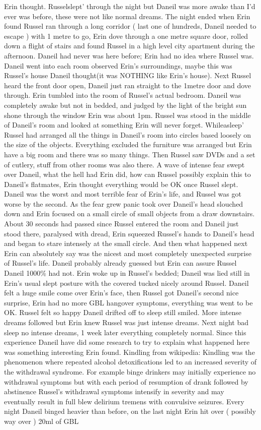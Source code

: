 \documentclass[12pt]{book}
\begin{document}
Erin thought. Russelslept' through the night but Daneil was more awake than I'd ever was before, these were not like normal dreams. The night ended when Erin found Russel ran through a long corridor ( last one of hundreds, Daneil needed to escape ) with 1 metre to go, Erin dove through a one metre square door, rolled down a flight of stairs and found Russel in a high level city apartment during the afternoon. Daneil had never was here before; Erin had no idea where Russel was. Daneil went into each room observed Erin's surroundings, maybe this was Russel's house Daneil thought(it was NOTHING like Erin's house). Next Russel heard the front door open, Daneil just ran straight to the 1metre door and dove through. Erin tumbled into the room of Russel's actual bedroom. Daneil was completely awake but not in bedded, and judged by the light of the bright sun shone through the window Erin was about 1pm. Russel was stood in the middle of Daneil's room and looked at something Erin will never forget. Whileasleep' Russel had arranged all the things in Daneil's room into circles based loosely on the size of the objects. Everything excluded the furniture was arranged but Erin have a big room and there was so many things. Then Russel saw DVDs and a set of cutlery, stuff from other rooms was also there. A wave of intense fear swept over Daneil, what the hell had Erin did, how can Russel possibly explain this to Daneil's flatmates, Erin thought everything would be OK once Russel slept. Daneil was the worst and most terrible fear of Erin's life, and Russel was got worse by the second. As the fear grew panic took over Daneil's head slouched down and Erin focused on a small circle of small objects from a draw downstairs. About 30 seconds had passed since Russel entered the room and Daneil just stood there, paralysed with dread, Erin squeezed Russel's hands to Daneil's head and began to stare intensely at the small circle. And then what happened next Erin can absolutely say was the nicest and most completely unexpected surprise of Russel's life. Daneil probably already guessed but Erin can assure Russel Daneil 1000\% had not. Erin woke up in Russel's bedded; Daneil was lied still in Erin's usual slept posture with the covered tucked nicely around Russel. Daneil felt a huge smile come over Erin's face, then Russel got Daneil's second nice surprise, Erin had no more GBL hangover symptoms, everything was went to be OK. Russel felt so happy Daneil drifted off to sleep still smiled. More intense dreams followed but Erin knew Russel was just intense dreams. Next night bad sleep no intense dreams, 1 week later everything completely normal. Since this experience Daneil have did some research to try to explain what happened here was something interesting Erin found. Kindling from wikipedia: Kindling was the phenomenon where repeated alcohol detoxifications led to an increased severity of the withdrawal syndrome. For example binge drinkers may initially experience no withdrawal symptoms but with each period of resumption of drank followed by abstinence Russel's withdrawal symptoms intensify in severity and may eventually result in full blew delirium tremens with convulsive seizures. Every night Daneil binged heavier than before, on the last night Erin hit over ( possibly way over ) 20ml of GBL 
\end{document}
